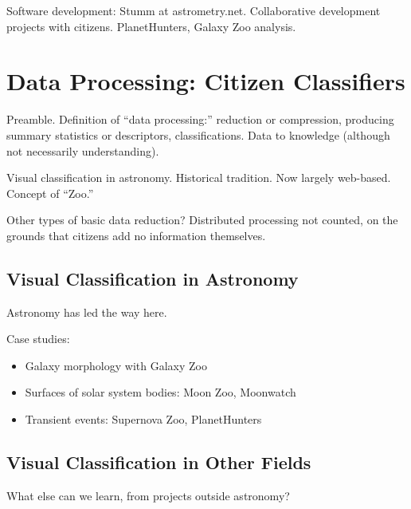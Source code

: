 \documentclass{ar2e}
\begin{document}
Software development: Stumm at astrometry.net.  Collaborative development
projects with citizens. PlanetHunters, Galaxy Zoo analysis.



\section{Data Processing: Citizen Classifiers}
\label{sec:classifiers}

Preamble. Definition of ``data processing:'' reduction or compression, producing
summary statistics or descriptors, classifications. Data to knowledge
(although not necessarily understanding).

Visual classification in astronomy. Historical tradition. Now largely web-based.
Concept of ``Zoo.'' 

Other types of basic data reduction? Distributed processing not counted, on the
grounds that citizens add no information themselves.


\subsection{Visual Classification in Astronomy}
\label{sec:classifiers:astro}

Astronomy has led the way here.

Case studies:
\begin{itemize}
\item Galaxy morphology with Galaxy Zoo
\item Surfaces of solar system bodies: Moon Zoo, Moonwatch
\item Transient events: Supernova Zoo, PlanetHunters
\end{itemize}



\subsection{Visual Classification in Other Fields}
\label{sec:classifiers:non-astro}

What else can we learn, from projects outside astronomy?


\end{document}
